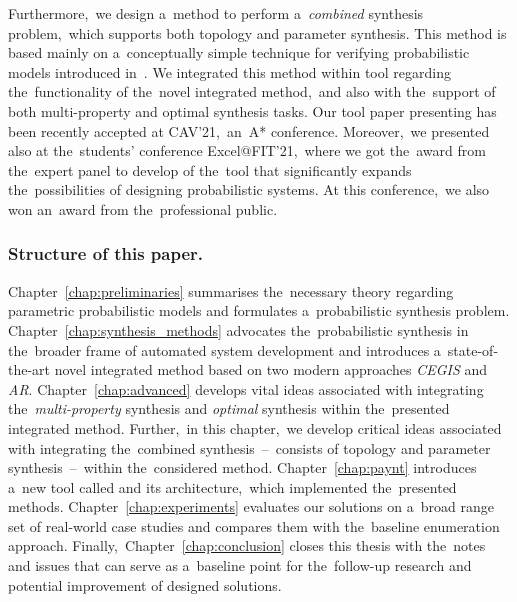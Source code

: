 Furthermore,~we design a~method to perform a~\emph{combined} synthesis problem,~which supports both topology and parameter synthesis.
This method is based mainly on a~conceptually simple technique for verifying probabilistic models introduced in~\cite{Quatmann2016}.
We integrated this method within tool \toolname{} regarding the~functionality of the~novel integrated method,~and also with the~support of both multi-property and optimal synthesis tasks.
Our tool paper presenting \toolname{} has been recently accepted at CAV'21,~an~A* conference.
Moreover,~we presented \toolname{} also at the~students' conference Excel@FIT'21,~where we got the~award from the~expert panel to develop of the~tool that significantly expands the~possibilities of designing probabilistic systems.
At this conference,~we also won an~award from the~professional public.


\subsubsection*{Structure of this paper.}
Chapter~\ref{chap:preliminaries} summarises the~necessary theory regarding parametric probabilistic models and formulates a~probabilistic synthesis problem. 
Chapter~\ref{chap:synthesis_methods} advocates the~probabilistic synthesis in the~broader frame of automated system development and introduces a~state-of-the-art novel integrated method based on two modern approaches \textit{CEGIS} and \textit{AR}.
Chapter~\ref{chap:advanced} develops vital ideas associated with integrating the~\textit{multi-property} synthesis and \textit{optimal} synthesis within the~presented integrated method.
Further,~in this chapter,~we develop critical ideas associated with integrating the~combined synthesis \,--\, consists of topology and parameter synthesis \,--\, within the~considered method.
Chapter~\ref{chap:paynt} introduces a~new tool called \toolname{} and its architecture,~which implemented the~presented methods.
Chapter~\ref{chap:experiments} evaluates our solutions on a~broad range set of real-world case studies and compares them with the~baseline enumeration approach.
Finally,~Chapter~\ref{chap:conclusion} closes this thesis with the~notes
and issues that can serve as a~baseline point for the~follow-up research and potential improvement of designed solutions.